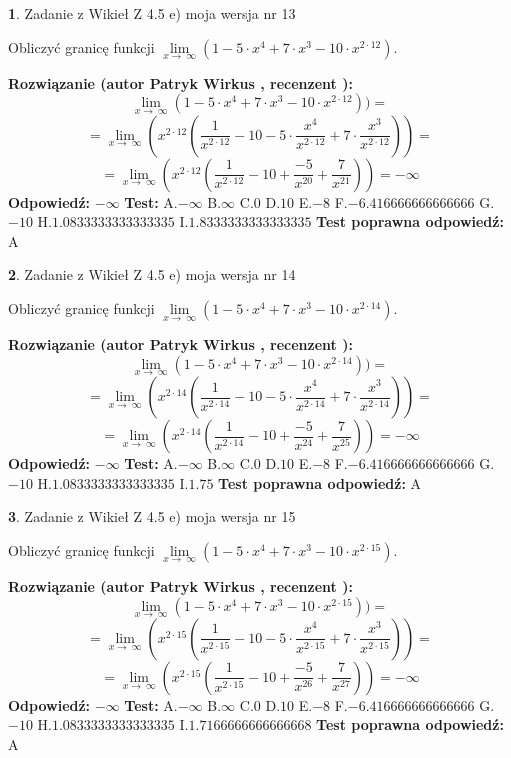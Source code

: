 \documentclass[12pt, a4paper]{article}
\theoremstyle{definition} %
\newtheorem{zad}{}
\newcommand{\zadStart}[1]{\begin{zad}#1\newline}
\newcommand{\zadStop}{\end{zad}}
\newcommand{\rozwStart}[2]{\noindent \textbf{Rozwiązanie (autor #1 , recenzent #2): }\newline}
\newcommand{\rozwStop}{\newline}
\newcommand{\odpStart}{\noindent \textbf{Odpowiedź:}\newline}
\newcommand{\odpStop}{\newline}
\newcommand{\testStart}{\noindent \textbf{Test:}\newline}
\newcommand{\testStop}{\newline}
\newcommand{\kluczStart}{\noindent \textbf{Test poprawna odpowiedź:}\newline}
\newcommand{\kluczStop}{\newline}
\begin{document}
\zadStart{Zadanie z Wikieł Z 4.5 e) moja wersja nr 13}


Obliczyć granicę funkcji  $\lim\limits_{x\to\ \infty}(1 - 5 \cdot x^{4}+7 \cdot x^{3}- 10 \cdot x^{2\cdot12})$.
\zadStop
\rozwStart{Patryk Wirkus}{}
$$\lim\limits_{x\to\ \infty}(1 - 5 \cdot x^{4}+7 \cdot x^{3}- 10 \cdot x^{2\cdot12}))=$$
$$=\lim\limits_{x\to\ \infty}(x^{2\cdot12}(\frac{1}{x^{2\cdot12}}-10 -5 \cdot \frac{x^{4}}{x^{2\cdot12}}+7 \cdot \frac{x^{3}}{x^{2\cdot12}}))=$$
$$=\lim\limits_{x\to\ \infty}(x^{2\cdot12}(\frac{1}{x^{2\cdot12}}-10 + \frac{-5}{x^{20}}+ \frac{7}{x^{21}}))=-\infty$$
\rozwStop
\odpStart
$-\infty$
\odpStop
\testStart
A.$-\infty$ B.$\infty$ C.$0$ D.$10$ E.$-8$
F.$-6.416666666666666$ G.$-10$
H.$1.0833333333333335$
I.$1.8333333333333335$
\testStop
\kluczStart
A
\kluczStop



\zadStart{Zadanie z Wikieł Z 4.5 e) moja wersja nr 14}


Obliczyć granicę funkcji  $\lim\limits_{x\to\ \infty}(1 - 5 \cdot x^{4}+7 \cdot x^{3}- 10 \cdot x^{2\cdot14})$.
\zadStop
\rozwStart{Patryk Wirkus}{}
$$\lim\limits_{x\to\ \infty}(1 - 5 \cdot x^{4}+7 \cdot x^{3}- 10 \cdot x^{2\cdot14}))=$$
$$=\lim\limits_{x\to\ \infty}(x^{2\cdot14}(\frac{1}{x^{2\cdot14}}-10 -5 \cdot \frac{x^{4}}{x^{2\cdot14}}+7 \cdot \frac{x^{3}}{x^{2\cdot14}}))=$$
$$=\lim\limits_{x\to\ \infty}(x^{2\cdot14}(\frac{1}{x^{2\cdot14}}-10 + \frac{-5}{x^{24}}+ \frac{7}{x^{25}}))=-\infty$$
\rozwStop
\odpStart
$-\infty$
\odpStop
\testStart
A.$-\infty$ B.$\infty$ C.$0$ D.$10$ E.$-8$
F.$-6.416666666666666$ G.$-10$
H.$1.0833333333333335$
I.$1.75$
\testStop
\kluczStart
A
\kluczStop



\zadStart{Zadanie z Wikieł Z 4.5 e) moja wersja nr 15}


Obliczyć granicę funkcji  $\lim\limits_{x\to\ \infty}(1 - 5 \cdot x^{4}+7 \cdot x^{3}- 10 \cdot x^{2\cdot15})$.
\zadStop
\rozwStart{Patryk Wirkus}{}
$$\lim\limits_{x\to\ \infty}(1 - 5 \cdot x^{4}+7 \cdot x^{3}- 10 \cdot x^{2\cdot15}))=$$
$$=\lim\limits_{x\to\ \infty}(x^{2\cdot15}(\frac{1}{x^{2\cdot15}}-10 -5 \cdot \frac{x^{4}}{x^{2\cdot15}}+7 \cdot \frac{x^{3}}{x^{2\cdot15}}))=$$
$$=\lim\limits_{x\to\ \infty}(x^{2\cdot15}(\frac{1}{x^{2\cdot15}}-10 + \frac{-5}{x^{26}}+ \frac{7}{x^{27}}))=-\infty$$
\rozwStop
\odpStart
$-\infty$
\odpStop
\testStart
A.$-\infty$ B.$\infty$ C.$0$ D.$10$ E.$-8$
F.$-6.416666666666666$ G.$-10$
H.$1.0833333333333335$
I.$1.7166666666666668$
\testStop
\kluczStart
A
\kluczStop
\end{document}
